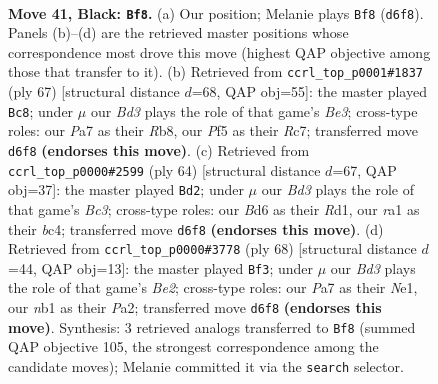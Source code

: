 \documentclass[11pt]{article}
\begin{document}
\clearpage

\begin{figure}[p]\centering
\begin{subfigure}{0.46\textwidth}\centering
\resizebox{\linewidth}{!}{%
\newchessgame
\chessboard[
  setfen={2r5/p5p1/P1bb1nkp/1p3p2/1P3P2/4P1PK/1R6/RNB5 b - - 12 41},
  showmover=false,
  pgfstyle=straightmove, color=movearrow, markmove={d6-f8}
]}
\caption{}
\end{subfigure}\hfill
\begin{subfigure}{0.46\textwidth}\centering
\resizebox{\linewidth}{!}{%
\newchessgame
\chessboard[
  setfen={1r3n2/2r1ppk1/4b1p1/p1p5/2P2PP1/1P1N4/P1K1B2R/5R2 b - - 2 34},
  showmover=false,
  pgfstyle=straightmove, color=movearrow, markmove={e6-c8}
]}
\caption{}
\end{subfigure}
\\[4pt]
\begin{subfigure}{0.46\textwidth}\centering
\resizebox{\linewidth}{!}{%
\newchessgame
\chessboard[
  setfen={2r3k1/5pp1/1p5p/p1n5/2bN2P1/P1BpP3/1P3PP1/3R2K1 w - - 5 33},
  showmover=false,
  pgfstyle=straightmove, color=movearrow, markmove={c3-d2}
]}
\caption{}
\end{subfigure}\hfill
\begin{subfigure}{0.46\textwidth}\centering
\resizebox{\linewidth}{!}{%
\newchessgame
\chessboard[
  setfen={4b1k1/5p2/p1n3p1/1p2r2p/8/bP2B2P/P3BPP1/1R2NK2 w - - 0 35},
  showmover=false,
  pgfstyle=straightmove, color=movearrow, markmove={e2-f3}
]}
\caption{}
\end{subfigure}
\caption{\textbf{Move 41, Black: \texttt{Bf8}.} (a) Our position; Melanie plays \texttt{Bf8} (\texttt{d6f8}). Panels (b)--(d) are the retrieved master positions whose correspondence most drove this move (highest QAP objective among those that transfer to it). (b) Retrieved from \texttt{ccrl\_top\_p0001\#1837} (ply 67) [structural distance $d$=68, QAP obj=55]: the master played \texttt{Bc8}; under $\mu$ our \emph{Bd3} plays the role of that game's \emph{Be3}; cross-type roles: our \emph{P}a7 as their \emph{R}b8, our \emph{P}f5 as their \emph{R}c7; transferred move \texttt{d6f8} \textbf{(endorses this move)}. (c) Retrieved from \texttt{ccrl\_top\_p0000\#2599} (ply 64) [structural distance $d$=67, QAP obj=37]: the master played \texttt{Bd2}; under $\mu$ our \emph{Bd3} plays the role of that game's \emph{Bc3}; cross-type roles: our \emph{B}d6 as their \emph{R}d1, our \emph{r}a1 as their \emph{b}c4; transferred move \texttt{d6f8} \textbf{(endorses this move)}. (d) Retrieved from \texttt{ccrl\_top\_p0000\#3778} (ply 68) [structural distance $d$=44, QAP obj=13]: the master played \texttt{Bf3}; under $\mu$ our \emph{Bd3} plays the role of that game's \emph{Be2}; cross-type roles: our \emph{P}a7 as their \emph{N}e1, our \emph{n}b1 as their \emph{P}a2; transferred move \texttt{d6f8} \textbf{(endorses this move)}. Synthesis: 3 retrieved analogs transferred to \texttt{Bf8} (summed QAP objective 105, the strongest correspondence among the candidate moves); Melanie committed it via the \texttt{search} selector.}
\label{fig:thought-m81}
\end{figure}
\end{document}
